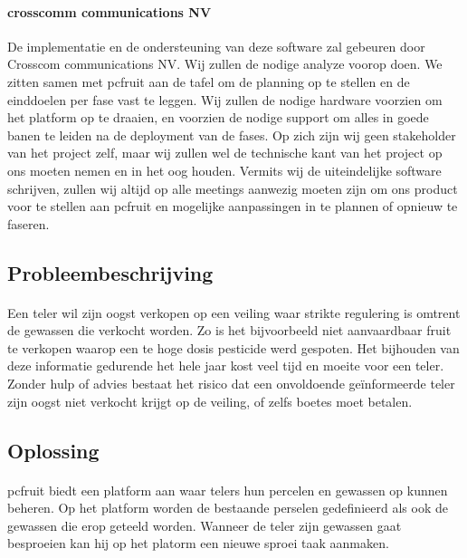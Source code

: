 \paragraph {crosscomm communications NV} De implementatie en de ondersteuning van deze software zal gebeuren door Crosscom communications NV. Wij zullen de nodige analyze voorop doen. We zitten samen met pcfruit aan de tafel om de planning op te stellen en de einddoelen per fase vast te leggen. Wij zullen de nodige hardware voorzien om het platform op te draaien, en voorzien de nodige support om alles in goede banen te leiden na de deployment van de fases. Op zich zijn wij geen stakeholder van het project zelf, maar wij zullen wel de technische kant van het project op ons moeten nemen en in het oog houden. Vermits wij de uiteindelijke software schrijven, zullen wij altijd op alle meetings aanwezig moeten zijn om ons product voor te stellen aan pcfruit en mogelijke aanpassingen in te plannen of opnieuw te faseren.


\subsection {Probleembeschrijving}

\paragraph {} Een teler wil zijn oogst verkopen op een veiling waar strikte regulering is
omtrent de gewassen die verkocht worden. Zo is het bijvoorbeeld niet aanvaardbaar fruit te
verkopen waarop een te hoge dosis pesticide werd gespoten. Het bijhouden van deze
informatie gedurende het hele jaar kost veel tijd en moeite voor een teler. Zonder hulp of
advies bestaat het risico dat een onvoldoende geïnformeerde teler zijn oogst niet verkocht
krijgt op de veiling, of zelfs boetes moet betalen.


\subsection {Oplossing}

\paragraph {} pcfruit biedt een platform aan waar telers hun percelen en gewassen op
kunnen beheren. Op het platform worden de bestaande perselen gedefinieerd als ook de
gewassen die erop geteeld worden. Wanneer de teler zijn gewassen gaat besproeien kan hij
op het platorm een nieuwe sproei taak aanmaken.


